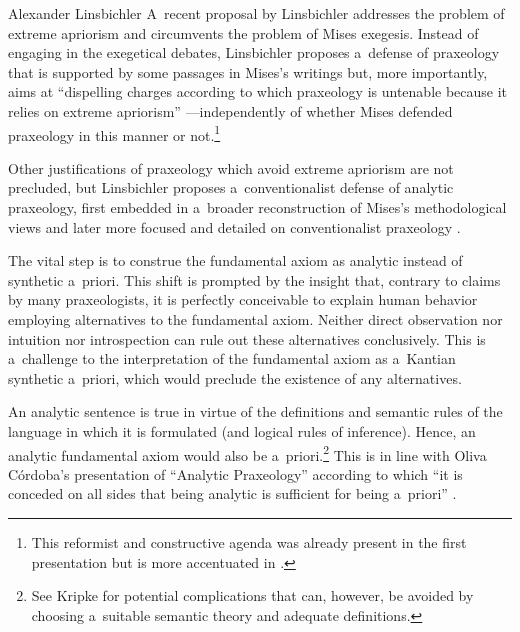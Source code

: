 \begin{artengenv}{Alexander Linsbichler}
A~recent proposal by Linsbichler 
\parencites[][]{linsbichler_was_2017}[][]{linsbichler_austrian_2021} %
 addresses the problem of extreme apriorism and circumvents the problem of Mises exegesis. Instead of engaging in the exegetical debates, Linsbichler proposes a~defense of praxeology that is supported by some passages in Mises's writings but, more importantly, aims at ``dispelling charges according to which praxeology is untenable because it relies on extreme apriorism'' 
\parencite[][p.204]{linsbichler_otto_2021}%
---independently of whether Mises defended praxeology in this manner or not.\footnote{This reformist and constructive agenda was already present in the first presentation 
\parencite[][see e~.g. p.124]{linsbichler_was_2017} %
 but is more accentuated in 
\parencites[][]{linsbichler_austrian_2021}[][]{linsbichler_otto_2021}.%
}



Other justifications of praxeology which avoid extreme apriorism are not precluded, but Linsbichler 
\parencite*[][]{linsbichler_was_2017} %
 proposes a~conventionalist defense of analytic praxeology, first embedded in a~broader reconstruction of Mises's methodological views and later more focused and detailed on conventionalist praxeology 
\parencite[][]{linsbichler_austrian_2021}.%




The vital step is to construe the fundamental axiom as analytic instead of synthetic a~priori. This shift is prompted by the insight that, contrary to claims by many praxeologists, it is perfectly conceivable to explain human behavior employing alternatives to the fundamental axiom. Neither direct observation nor intuition nor introspection can rule out these alternatives conclusively. This is a~challenge to the interpretation of the fundamental axiom as a~Kantian synthetic a~priori, which would preclude the existence of any alternatives.



An analytic sentence is true in virtue of the definitions and semantic rules of the language in which it is formulated (and logical rules of inference). Hence, an analytic fundamental axiom would also be a~priori.\footnote{See Kripke 
\parencites*[][]{kripke_naming_1972}[][pp.122–123]{kripke_naming_1980} %
 for potential complications that can, however, be avoided by choosing a~suitable semantic theory and adequate definitions. } This is in line with Oliva Córdoba's presentation of ``Analytic Praxeology'' according to which ``it is conceded on all sides that being analytic is sufficient for being a~priori'' 
\parencites[][p.528]{oliva_cordoba_uneasiness_2017}[see also 523,][]{oliva_cordoba_uneasiness_2017}.%





\end{artengenv}

